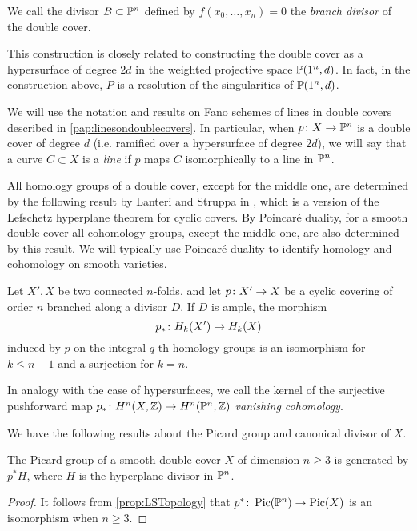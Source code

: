 We call the divisor $B \subset \P^n$ defined by $f(x_0,\dots,x_n) = 0$ the \emph{branch divisor} of the double cover.

\begin{remark}
  This construction is closely related to constructing the double cover as a hypersurface of degree $2d$ in the weighted projective space $\P(1^n,d)$. In fact, in the construction above, $P$ is a resolution of the singularities of $\P(1^n,d)$.
\end{remark}

We will use the notation and results on Fano schemes of lines in double covers described in \cref{pap:linesondoublecovers}. In particular, when $p \from X \to \P^n$ is a double cover of degree $d$ (i.e. ramified over a hypersurface of degree $2d$), we will say that a curve $C \subset X$ is a \emph{line} if $p$ maps $C$ isomorphically to a line in $\P^n$.

All homology groups of a double cover, except for the middle one, are determined by the following result by Lanteri and Struppa in \cite{LS89}, which is a version of the Lefschetz hyperplane theorem for cyclic covers. By Poincar\'e duality, for a smooth double cover all cohomology groups, except the middle one, are also determined by this result. We will typically use Poincar\'e duality to identify homology and cohomology on smooth varieties.
\begin{proposition}[{\cite[Proposition 1.11]{LS89}}]
  \label{prop:LSTopology}
  Let $X',X$ be two connected $n$-folds, and let $p \from X' \to X$ be a cyclic covering of order $n$ branched along a divisor $D$. If $D$ is ample, the morphism
  \[p_* \from H_k(X') \to H_k(X) \]
  induced by $p$ on the integral $q$-th homology groups is an isomorphism for $k \leq n-1$ and a surjection for $k=n$.
\end{proposition}
In analogy with the case of hypersurfaces, we call the kernel of the surjective pushforward map $p_* \from H^n(X,\Z) \to H^n(\P^n,\Z)$ \emph{vanishing cohomology}.

We have the following results about the Picard group and canonical divisor of $X$.
\begin{proposition}
  The Picard group of a smooth double cover $X$ of dimension $n \geq 3$ is generated by $p^*H$, where $H$ is the hyperplane divisor in $\P^n$.
\end{proposition}
\begin{proof}
  It follows from \cref{prop:LSTopology} that $p^* \from \Pic(\P^n) \to \Pic(X)$ is an isomorphism when $n \geq 3$.
\end{proof}

